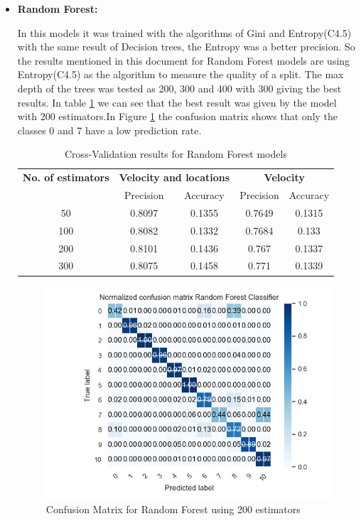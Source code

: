 \begin{itemize}
\newpage
\item \textbf{ Random Forest: }

In this models it was trained with the algorithms of Gini and Entropy(C4.5) with the same result of Decision trees, the Entropy was a better precision. So the results mentioned in this document for Random Forest models are using Entropy(C4.5) as the algorithm to measure the quality of a split. The max depth of the trees was tested as 200, 300 and 400 with 300 giving the best results. In table \ref{table:cross_val_rf} we can see that the best result was given by the model with 200 estimators.In Figure \ref{table:cross_val_rf} the confusion matrix shows that only the classes 0 and 7 have a low prediction rate. 


\begin {table}[H]
\begin{center}
\begin{tabular}{c|c|c|c|c}
\multicolumn{1}{c|}{\textbf{No. of estimators } }   &\multicolumn{2}{c|}{\textbf{ Velocity and locations}}& \multicolumn{2}{c}{\textbf{ Velocity}}\\
&Precision & Accuracy & Precision & Accuracy \\
\hline
50  &0.8097&0.1355 &0.7649 &0.1315\\
100 &0.8082&0.1332 &0.7684 &0.133\\
200 &0.8101&0.1436 &0.767  &0.1337 \\
300 &0.8075&0.1458 &0.771 &0.1339 
\label{table:cross_val_rf}
\end{tabular}
\caption {Cross-Validation results for Random Forest models}
\end{center}
\end {table}


\begin{figure}[h]
    \centering
    \includegraphics[width=0.8\linewidth]{Chapters/img/CM_RF.png}
    \caption{Confusion Matrix for Random Forest using 200 estimators}
    \label{fig:cm_rf}
\end{figure}



\end{itemize}
